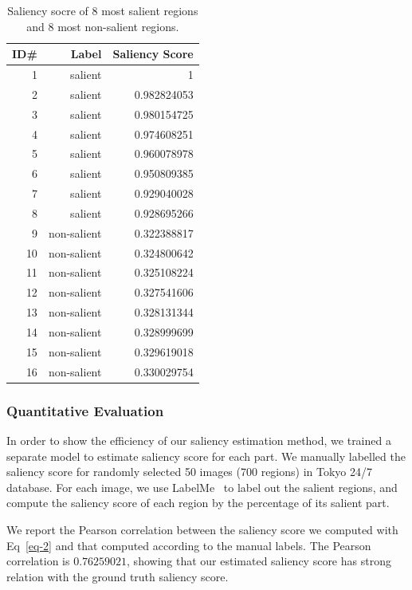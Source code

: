 \begin{table}[htbp]
\begin{tabular}{r|r|r}
ID\# & Label & Saliency Score \\
\hline \hline
1 & salient & 1 \\
2 & salient & 0.982824053 \\
3 & salient & 0.980154725 \\
4 & salient & 0.974608251 \\
5 & salient & 0.960078978 \\
6 & salient & 0.950809385 \\
7 & salient & 0.929040028 \\
8 & salient & 0.928695266 \\
9 & non-salient & 0.322388817 \\
10 & non-salient & 0.324800642 \\
11 & non-salient & 0.325108224 \\
12 & non-salient & 0.327541606 \\
13 & non-salient & 0.328131344 \\
14 & non-salient & 0.328999699 \\
15 & non-salient & 0.329619018 \\
16 & non-salient & 0.330029754
\end{tabular}
\caption{Saliency socre of 8 most salient regions and 8 most non-salient regions.}
\label{table:saliencyscore}
\end{table}

\subsubsection{Quantitative  Evaluation}
\par
In order to show the efficiency of our saliency estimation method, we trained a separate model to estimate saliency score for each part. We manually labelled the saliency score for randomly selected 50 images (700 regions) in Tokyo 24/7 database. For each image, we use LabelMe~\cite{Russell2008} to label out the salient regions, and compute the saliency score of each region by the percentage of its salient part. 
\par
We report the Pearson correlation between the saliency score we computed with Eq~\eqref{eq-2} and that computed according to the manual labels. The Pearson correlation is $0.76259021$, showing that our estimated saliency score has strong relation with the ground truth saliency score. 




